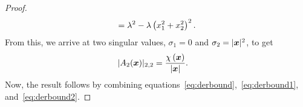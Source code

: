 \begin{proof}
\begin{align*}
        = \lambda^2  - \lambda\left({x}_1^2+{x}_2^2 \right)^2.
    \end{align*}
    From this, we arrive at two singular values, $\sigma_1 = 0$ and $\sigma_2=|{{\bm{x}}}|^2$, to get
    \begin{align}
        |A_2(\x)|_{2,2} %
        &= \frac{\chi\left(\x\right)}{|\x|}.  \label{eq:derbound2}
    \end{align}
    Now, the result follows by combining equations~\eqref{eq:derbound},~\eqref{eq:derbound1}, and~\eqref{eq:derbound2}.
\end{proof}

